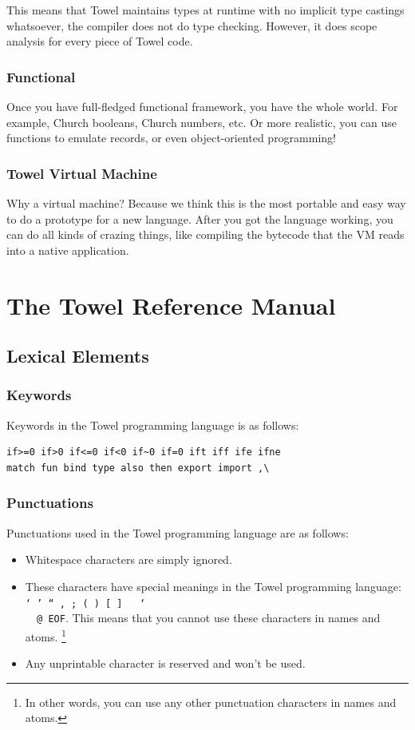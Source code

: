 \documentclass{report}
\begin{document}
This means that Towel maintains types at runtime with no implicit type castings whatsoever, the compiler does not do type checking. However, it does scope analysis for every piece of Towel code.

\section{Functional}

Once you have full-fledged functional framework, you have the whole world. For example, Church booleans, Church numbers, etc. Or more realistic, you can use functions to emulate records, or even object-oriented programming!

\section{Towel Virtual Machine}

Why a virtual machine? Because we think this is the most portable and easy way to do a prototype for a new language. After you got the language working, you can do all kinds of crazing things, like compiling the bytecode that the VM reads into a native application.

\part{The Towel Reference Manual}

\chapter{Lexical Elements}\label{chap:grammar}
\section{Keywords}

Keywords in the Towel programming language is as follows:
\begin{verbatim}
if>=0 if>0 if<=0 if<0 if~0 if=0 ift iff ife ifne
match fun bind type also then export import ,\
\end{verbatim}

\section{Punctuations}

Punctuations used in the Towel programming language are as follows:

\begin{itemize}
\item Whitespace characters are simply ignored.
\item These characters have special meanings in the Towel programming language: \texttt{` ' `` , ; ( ) [ ] { } \char`\\ ~  @ EOF}. This means that you cannot use these characters in names and atoms. \footnote{In other words, you can use any other punctuation characters in names and atoms.}
\item Any unprintable character is reserved and won't be used.
\end{itemize}
\end{document}
